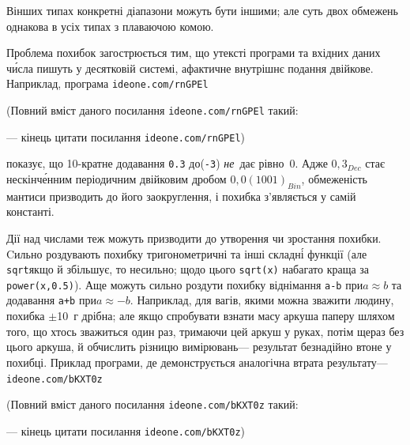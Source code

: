 \documentclass[14pt,a4paper]{extarticle}
\renewcommand{\baselinestretch}{1.3125}
\begin{document}
В\nolinebreak[3] інших типах конкретні діапазони можуть бути іншими; але суть двох обмежень однакова в усіх типах з плаваючою комою. 

Проблема похибок загострюється тим, що у\nolinebreak[3] тексті програми та вхідних даних ч\'{и}сла пишуть у десятковій системі, а\nolinebreak[2] фактичне внутрішнє подання двійкове. 
Наприклад, програма 
\verb"ideone.com/rnGPEl"


{\color{green}\begin{small}

\renewcommand{\baselinestretch}{0.875}

(Повний вміст даного посилання \verb"ideone.com/rnGPEl" такий:

--- кінець цитати посилання \verb"ideone.com/rnGPEl")

\end{small}}


 показує, що 10-\nolinebreak[2]кратне додавання \texttt{0.3} до\nolinebreak[2] (\texttt{-3}) \emph{не}~дає рівно~0. Адже $0{,}3_{Dec}$ стає нескін\-ч\'{е}н\-ним періодичним двійковим дробом $0{,}0(1001)_{Bin}$, обмеженість мантиси призводить до його заокруглення, і похибка з'являється у самій константі.\label{text:floating-point-error-in-0.3}

Дії над числами теж можуть призводити до утворення чи зростання похибки. Cильно роздувають похибку тригонометричні та інші складн\'{і} функції (але \verb"sqrt"\nolinebreak[1] якщо й збільшує, то не\nolinebreak[3] сильно; щодо цього \verb"sqrt(x)" набагато краща за \verb"power(x,0.5)"). А\nolinebreak[3] ще можуть сильно роздути похибку віднімання \verb"a-b" при\nolinebreak[2] ${a{\approx}b}$ та додавання \verb"a+b" при\nolinebreak[3] ${a{\approx}{-}b}$. Наприклад, для вагів, якими можна зважити людину, похибка $\pm$10~г дрібна; але якщо спробувати взнати масу аркуша паперу шляхом того, що хтось зважиться один раз, тримаючи цей аркуш у руках, потім ще\nolinebreak[3] раз без цього аркуша, й обчислить різницю вимірювань\nolinebreak[3] --- результат безнадійно втоне у похибці.
Приклад програми, де демонструється аналогічна втрата результату\nolinebreak[3] --- 
\verb"ideone.com/bKXT0z"


{\color{green}\begin{small}

\renewcommand{\baselinestretch}{0.875}

(Повний вміст даного посилання \verb"ideone.com/bKXT0z" такий:

--- кінець цитати посилання \verb"ideone.com/bKXT0z")

\end{small}}
\end{document}
